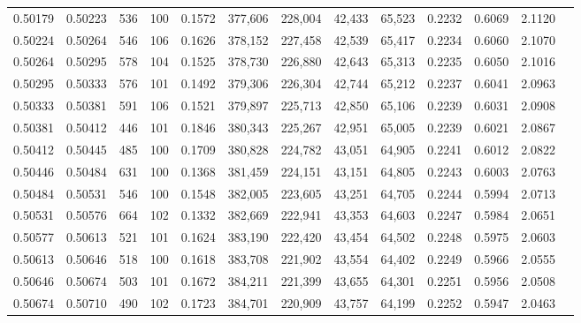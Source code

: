 \begin{tabular}{rrrrrrrrrrrrr}
0.50179 & 0.50223 &   536 & 100 &                                     0.1572 & 377,606 & 228,004 &  42,433 &  65,523 & 0.2232 & 0.6069 & 2.1120 \\
0.50224 & 0.50264 &   546 & 106 &                                     0.1626 & 378,152 & 227,458 &  42,539 &  65,417 & 0.2234 & 0.6060 & 2.1070 \\
0.50264 & 0.50295 &   578 & 104 &                                     0.1525 & 378,730 & 226,880 &  42,643 &  65,313 & 0.2235 & 0.6050 & 2.1016 \\
0.50295 & 0.50333 &   576 & 101 &                                     0.1492 & 379,306 & 226,304 &  42,744 &  65,212 & 0.2237 & 0.6041 & 2.0963 \\
0.50333 & 0.50381 &   591 & 106 &                                     0.1521 & 379,897 & 225,713 &  42,850 &  65,106 & 0.2239 & 0.6031 & 2.0908 \\
0.50381 & 0.50412 &   446 & 101 &                                     0.1846 & 380,343 & 225,267 &  42,951 &  65,005 & 0.2239 & 0.6021 & 2.0867 \\
0.50412 & 0.50445 &   485 & 100 &                                     0.1709 & 380,828 & 224,782 &  43,051 &  64,905 & 0.2241 & 0.6012 & 2.0822 \\
0.50446 & 0.50484 &   631 & 100 &                                     0.1368 & 381,459 & 224,151 &  43,151 &  64,805 & 0.2243 & 0.6003 & 2.0763 \\
0.50484 & 0.50531 &   546 & 100 &                                     0.1548 & 382,005 & 223,605 &  43,251 &  64,705 & 0.2244 & 0.5994 & 2.0713 \\
0.50531 & 0.50576 &   664 & 102 &                                     0.1332 & 382,669 & 222,941 &  43,353 &  64,603 & 0.2247 & 0.5984 & 2.0651 \\
0.50577 & 0.50613 &   521 & 101 &                                     0.1624 & 383,190 & 222,420 &  43,454 &  64,502 & 0.2248 & 0.5975 & 2.0603 \\
0.50613 & 0.50646 &   518 & 100 &                                     0.1618 & 383,708 & 221,902 &  43,554 &  64,402 & 0.2249 & 0.5966 & 2.0555 \\
0.50646 & 0.50674 &   503 & 101 &                                     0.1672 & 384,211 & 221,399 &  43,655 &  64,301 & 0.2251 & 0.5956 & 2.0508 \\
0.50674 & 0.50710 &   490 & 102 &                                     0.1723 & 384,701 & 220,909 &  43,757 &  64,199 & 0.2252 & 0.5947 & 2.0463 \\

\end{tabular}
